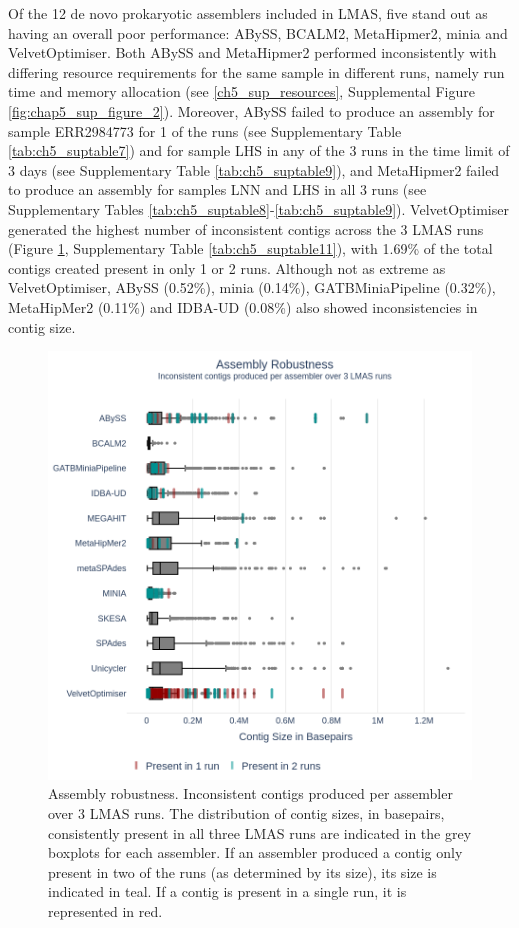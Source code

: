 Of the 12 de novo prokaryotic assemblers included in LMAS, five stand out as having an overall poor performance: ABySS, BCALM2, MetaHipmer2, minia and VelvetOptimiser. Both ABySS and MetaHipmer2 performed inconsistently with differing resource requirements for the same sample in different runs, namely run time and memory allocation (see \ref{ch5_sup_resources}, Supplemental Figure \ref{fig:chap5_sup_figure_2}).  Moreover, ABySS failed to produce an assembly for sample ERR2984773 for 1 of the runs (see Supplementary Table \ref{tab:ch5_suptable7}) and for sample LHS in any of the 3 runs in the time limit of 3 days (see Supplementary Table \ref{tab:ch5_suptable9}), and MetaHipmer2 failed to produce an assembly for samples LNN and LHS in all 3 runs (see Supplementary Tables \ref{tab:ch5_suptable8}-\ref{tab:ch5_suptable9}). VelvetOptimiser generated the highest number of inconsistent contigs across the 3 LMAS runs (Figure \ref{fig:chap5_figure3}, Supplementary Table \ref{tab:ch5_suptable11}), with 1.69\% of the total contigs created present in only 1 or 2 runs. Although not as extreme as VelvetOptimiser, ABySS (0.52\%), minia (0.14\%), GATBMiniaPipeline (0.32\%), MetaHipMer2 (0.11\%) and IDBA-UD (0.08\%) also showed inconsistencies in contig size.

\begin{figure}[h!]
\centering
\includegraphics[width=\textwidth]{figures/chapter 5/Figure 3.png}
\caption{Assembly robustness. Inconsistent contigs produced per assembler over 3 LMAS runs. The distribution of contig sizes, in basepairs, consistently present in all three LMAS runs are indicated in the grey boxplots for each assembler. If an assembler produced a contig only present in two of the runs (as determined by its size), its size is indicated in teal. If a contig is present in a single run, it is represented in red.}
\label{fig:chap5_figure3}
\end{figure}

